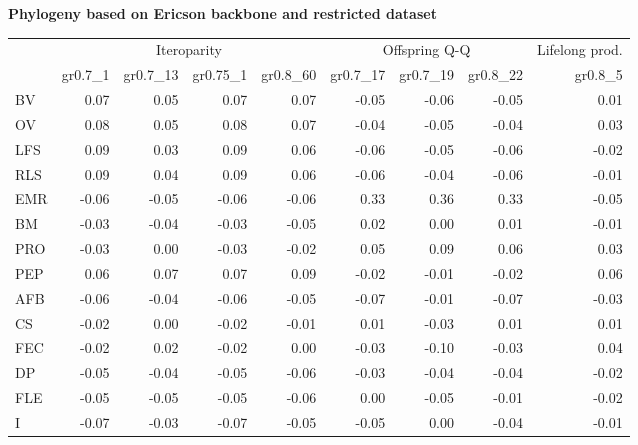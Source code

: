 \begin{landscape}
\begin{table}
\begin{footnotesize}
\textbf{Phylogeny based on Ericson backbone and restricted dataset}

\begin{tabular}{@{}l|rrrr|rrr|r@{}}
\toprule
 & \multicolumn{4}{c|}{Iteroparity} & \multicolumn{3}{c|}{Offspring Q-Q} & \multicolumn{1}{c}{Lifelong prod.}\\
 & gr0.7\_1 & gr0.7\_13 & gr0.75\_1 & gr0.8\_60 & gr0.7\_17 & gr0.7\_19 & gr0.8\_22 & gr0.8\_5\\
\midrule
BV & 0.07 & 0.05 & 0.07 & 0.07 & -0.05 & -0.06 & -0.05 & 0.01\\
OV & 0.08 & 0.05 & 0.08 & 0.07 & -0.04 & -0.05 & -0.04 & 0.03\\
LFS & 0.09 & 0.03 & 0.09 & 0.06 & -0.06 & -0.05 & -0.06 & -0.02\\
RLS & 0.09 & 0.04 & 0.09 & 0.06 & -0.06 & -0.04 & -0.06 & -0.01\\
EMR & -0.06 & -0.05 & -0.06 & -0.06 & 0.33 & 0.36 & 0.33 & -0.05\\
BM & -0.03 & -0.04 & -0.03 & -0.05 & 0.02 & 0.00 & 0.01 & -0.01\\
PRO & -0.03 & 0.00 & -0.03 & -0.02 & 0.05 & 0.09 & 0.06 & 0.03\\
PEP & 0.06 & 0.07 & 0.07 & 0.09 & -0.02 & -0.01 & -0.02 & 0.06\\
AFB & -0.06 & -0.04 & -0.06 & -0.05 & -0.07 & -0.01 & -0.07 & -0.03\\
CS & -0.02 & 0.00 & -0.02 & -0.01 & 0.01 & -0.03 & 0.01 & 0.01\\
FEC & -0.02 & 0.02 & -0.02 & 0.00 & -0.03 & -0.10 & -0.03 & 0.04\\
DP & -0.05 & -0.04 & -0.05 & -0.06 & -0.03 & -0.04 & -0.04 & -0.02\\
FLE & -0.05 & -0.05 & -0.05 & -0.06 & 0.00 & -0.05 & -0.01 & -0.02\\
I & -0.07 & -0.03 & -0.07 & -0.05 & -0.05 & 0.00 & -0.04 & -0.01\\
\bottomrule
\end{tabular}
\end{footnotesize}
\end{table}


\clearpage%

\begin{table}
\center
\begin{footnotesize}


\end{footnotesize}
\end{table}
\end{landscape}
